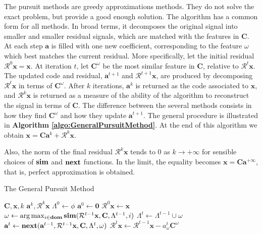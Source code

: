\documentclass[12pt,a4paper,oneside,english]{UPBThesis}
\newcommand{\hcrange}[2]{\overline{{#1}\colon\!\!{#2}}}
\begin{document}
The pursuit methods are greedy approximations methods. They do not solve the exact problem, but provide a good enough solution. The algorithm has a common form for all methods. In broad terms, it decomposes the original signal into smaller and smaller residual signals, which are matched with the features in $\textbf{C}$. At each step $\textbf{a}$ is filled with one new coefficient, corresponding to the feature $\omega$ which best matches the current residual. More specifically, let the initial residual $\mathcal{R}^0\textbf{x} = \textbf{x}$. At iteration $t$, let $\textbf{C}^\omega$ be the most similar feature in $\textbf{C}$, relative to $\mathcal{R}^t\textbf{x}$. The updated code and residual, $\textbf{a}^{t+1}$ and $\mathcal{R}^{t+1}\textbf{x}$, are produced by decomposing $\mathcal{R}^t\textbf{x}$ in terms of $\textbf{C}^\omega$. After $k$ iterations, $\textbf{a}^k$ is returned as the code associated to $\textbf{x}$, and $\mathcal{R}^k\textbf{x}$ is returned as a measure of the ability of the algorithm to reconstruct the signal in terms of $\textbf{C}$. The difference between the several methods consists in how they find $\textbf{C}^\omega$ and how they update $\textbf{a}^{t+1}$. The general procedure is illustrated in \textbf{Algorithm \ref{algo:GeneralPursuitMethod}}. At the end of this algorithm we obtain $\textbf{x} = \textbf{C}\textbf{a}^k + \mathcal{R}^k\textbf{x}$.

Also, the norm of the final residual $\mathcal{R}^k\textbf{x}$ tends to $0$ as $k \rightarrow +\infty$ for sensible choices of $\text{\textbf{sim}}$ and $\text{\textbf{next}}$ functions. In the limit, the equality becomes $\textbf{x} = \textbf{C}\textbf{a}^{+\infty}$, that is, perfect approximation is obtained.

\begin{algorithm}
\caption{The General Pursuit Method}
\label{algo:GeneralPursuitMethod}
\begin{algorithmic}
\Require $\textbf{C},\textbf{x},k$
\Ensure $\textbf{a}^k,\mathcal{R}^k\textbf{x}$
\State $\Lambda^0 \gets \phi$
\State $\textbf{a}^0 \gets \textbf{0}$
\State $\mathcal{R}^0\textbf{x} \gets \textbf{x}$
\For {$t = \hcrange{1}{k}$}
\State $\omega \gets \arg \max_{i \in \textbf{dom}} \text{\textbf{sim}}(\mathcal{R}^{t-1}\textbf{x},\textbf{C},\Lambda^{t-1},i)$
\State $\Lambda^t \gets \Lambda^{t-1} \cup \omega$
\State $\textbf{a}^t \gets \text{\textbf{next}}(\textbf{a}^{t-1},\mathcal{R}^{t-1}\textbf{x},\textbf{C},\Lambda^t,\omega)$
\State $\mathcal{R}^t\textbf{x} \gets \mathcal{R}^{t-1}\textbf{x} - a_\omega^t\textbf{C}^\omega$
\EndFor
\end{algorithmic}
\end{algorithm}
\end{document}
